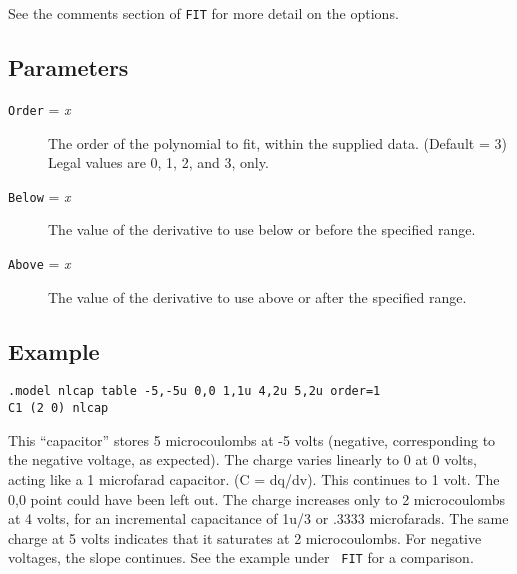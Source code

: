 See the comments section of {\tt FIT} for more detail on the options.
\subsection{Parameters}

\begin{description}
  
\item[{\tt Order} = {\it x}] The order of the polynomial to fit,
  within the supplied data.  (Default = 3) Legal values are 0, 1, 2,
  and 3, only.

\item[{\tt Below} = {\it x}] The value of the derivative to use
below or before the specified range.  

\item[{\tt Above} = {\it x}] The value of the derivative to use
above or after the specified range.

\end{description}
\subsection{Example} 

\begin{verbatim}
.model nlcap table -5,-5u 0,0 1,1u 4,2u 5,2u order=1
C1 (2 0) nlcap
\end{verbatim}

This ``capacitor'' stores 5 microcoulombs at -5 volts (negative,
corresponding to the negative voltage, as expected).  The charge
varies linearly to 0 at 0 volts, acting like a 1 microfarad capacitor.
(C = dq/dv).  This continues to 1 volt.  The 0,0 point could have been
left out.  The charge increases only to 2 microcoulombs at 4 volts,
for an incremental capacitance of 1u/3 or .3333 microfarads.  The same
charge at 5 volts indicates that it saturates at 2 microcoulombs.  For
negative voltages, the slope continues.  See the example under {\tt
  FIT} for a comparison.
